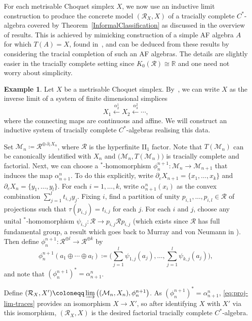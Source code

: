 \documentclass[a4paper,11pt]{amsart}
\theoremstyle{definition}
\newtheorem{example}[theorem]{Example}
\numberwithin{equation}{section}
\numberwithin{theorem}{section}
\newcommand{\R}{\mathcal R}
\newcommand{\M}{\mathcal{M}}
\begin{document}
For each metrisable Choquet simplex $X$, we now use an inductive limit construction to produce the concrete model $(\mathcal R_X, X)$ of a tracially complete $C^*$-algebra covered by Theorem~\ref{InformalClassification} as discussed in the overview of results.  This is achieved by mimicking construction of a simple AF algebra $A$ for which $T(A)=X$, found in~\cite{Bl80,Go77}, and can be deduced from these results by considering the tracial completion of such an AF algebras.  The details are slightly easier in the tracially complete setting since $K_0(\mathcal{R}) \cong \mathbb{R}$ and one need not worry about simplicity.

\begin{example}\label{Ex:ConcreteModels}
	Let $X$ be a metrisable Choquet simplex. By~\cite[Theorem~11.6]{Go86}, we can write $X$ as the inverse limit of a system of finite dimensional simplices
	\begin{equation} X_1 \stackrel{\alpha_2^{1}}\longleftarrow X_2 \stackrel{\alpha_3^{2}}\longleftarrow \cdots, \end{equation}
	where the connecting maps are continuous and affine. We will construct an inductive system of tracially complete $C^*$-algebras realising this data.
	
	Set $\M_n \coloneqq \mathcal R^{\oplus \, \partial_e X_n}$,
	where $\mathcal R$ is the hyperfinite II$_1$ factor. Note that $T(\M_n)$ can be canonically identified with $X_n$ and $\big(\M_n,T(\M_n)\big)$ is tracially complete and factorial.  Next, we can choose a $^*$-homomorphism $\phi_n^{n+1}\colon \M_n \to \M_{n+1}$ that induces the map $\alpha_{n+1}^{n}$.  To do this explicitly, write $\partial_e X_{n+1} = \{x_1,\dots,x_k\}$ and $\partial_e X_n = \{y_1,\dots,y_l\}$.
	For each $i=1,\dots,k$, write $\alpha_{n+1}^{n}(x_i)$ as the convex combination $\sum_{j=1}^l t_{i,j} y_j$.
	Fixing $i$, find a partition of unity $p_{i,1},\dots,p_{i,l} \in \mathcal R$ of projections such that $\tau(p_{i,j}) = t_{i,j}$ for each $j$.
	For each $i$ and $j$, choose any unital $^*$-homomorphism $\psi_{i,j}\colon \mathcal R \to p_{i,j}\mathcal R p_{i,j}$ (which exists since $\mathcal R$ has full fundamental group, a result which goes back to Murray and von Neumann in \cite{MvN43}).
	Then define $\phi_n^{n+1}\colon \mathcal{R}^{\oplus l} \to \mathcal{R}^{\oplus k}$ by
	\begin{equation} \phi_n^{n+1}(a_1\oplus \cdots \oplus a_l) \coloneqq \Big(\sum_{j=1}^l \psi_{1,j}(a_j),\dots,\sum_{j=1}^l \psi_{k,j}(a_j)\Big), 
	\end{equation}
	and note that $(\phi_n^{n+1})^* = \alpha_{n+1}^n$.
	  
	Define $(\R_X, X')\coloneqq \varinjlim \big((\M_n,X_n),\phi_n^{n+1}\big)$.  As $(\phi_n^{n+1})^* = \alpha_{n+1}^n$, \eqref{eq:proj-lim-traces} provides an isomorphism $X \rightarrow X'$, so after identifying $X$ with $X'$ via this isomorphism, $(\R_X, X)$ is the desired factorial tracially complete $C^*$-algebra.
\end{example}
\end{document}
